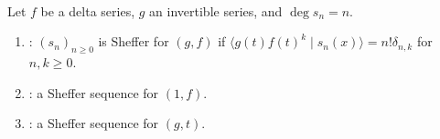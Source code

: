 \begin{definition} \label{def:sheffer-associated-appell-sequences} \\
Let $f$ be a delta series, $g$ an invertible series, and
$\deg s_n=n$.
\begin{enumerate}[label=(\roman*)]
\setlength{\itemsep}{0pt}
\item {}: $(s_n)_{n\geq0}$ is Sheffer for $(g,f)$ if $\langle g(t)f(t)^k\mid s_n(x)\rangle=n!\delta_{n,k}$ for $n,k\geq0$.
\item {}: a Sheffer sequence for $(1,f)$.
\item {}: a Sheffer sequence for $(g,t)$.
\end{enumerate}
\end{definition}

